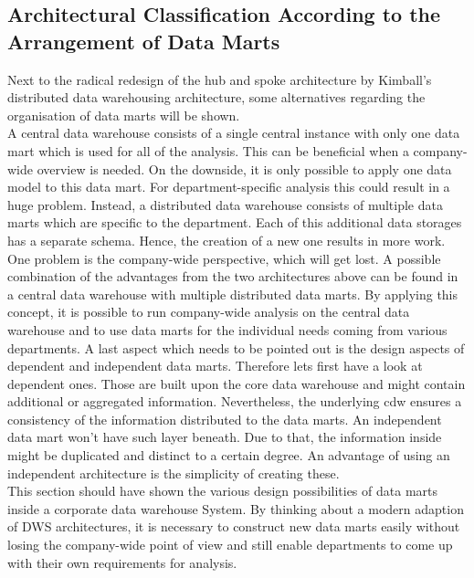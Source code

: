 \subsection{Architectural Classification According to the Arrangement of Data Marts}
Next to the radical redesign of the hub and spoke architecture by Kimball's distributed data warehousing architecture, some alternatives regarding the organisation of data marts will be shown.\newline
\\
A central data warehouse consists of a single central instance with only one data mart which is used for all of the analysis. This can be beneficial when a company-wide overview is needed. On the downside, it is only possible to apply one data model to this data mart. For department-specific analysis this could result in a huge problem. \newline
Instead, a distributed data warehouse consists of multiple data marts which are specific to the department. Each of this additional data storages has a separate schema. Hence, the creation of a new one results in more work. One problem is the company-wide perspective, which will get lost. \newline
A possible combination of the advantages from the two architectures above can be found in a central data warehouse with multiple distributed data marts. By applying this concept, it is possible to run company-wide analysis on the central data warehouse and to use data marts for the individual needs coming from various departments.
\newline
A last aspect which needs to be pointed out is the design aspects of dependent and independent data marts. Therefore lets first have a look at dependent ones. Those are built upon the core data warehouse and might contain additional or aggregated information. Nevertheless, the underlying \acrshort{cdw} ensures a consistency of the information distributed to the data marts. An independent data mart won't have such layer beneath. Due to that, the information inside might be duplicated and distinct to a certain degree. An advantage of using an independent architecture is the simplicity of creating these. \cite{scriptRasch} \newline
\\
This section should have shown the various design possibilities of data marts inside a corporate data warehouse System. By thinking about a modern adaption of DWS architectures, it is necessary to construct new data marts easily without losing the company-wide point of view and still enable departments to come up with their own requirements for analysis. 

